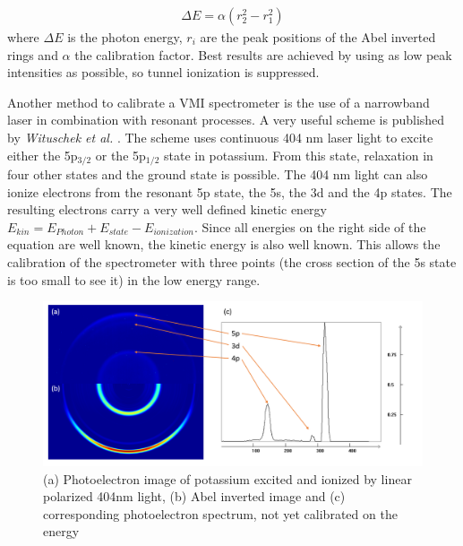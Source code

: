 \begin{align*}
\Delta E = \alpha (r_2^2-r_1^2)
\end{align*}
where $\Delta E$ is the photon energy, $r_i$ are the peak positions of the Abel inverted rings and $\alpha$ the calibration factor. Best results are achieved by using as low peak intensities as possible, so tunnel ionization is suppressed.


Another method to calibrate a VMI spectrometer is the use of a narrowband laser in combination with resonant processes. A very useful scheme is published by \textit{Wituschek et al.} \cite{wituschek_simple_2016}. The scheme uses continuous 404 nm laser light to excite either the 5p${}_{3/2}$ or the 5p${}_{1/2}$ state in potassium. From this state, relaxation in four other states and the ground state is possible. The 404 nm light can also ionize electrons from the resonant 5p state, the 5s, the 3d and the 4p states. The resulting electrons carry a very well defined kinetic energy $E_{kin}=E_{Photon}+E_{state}-E_{ionization}$. Since all energies on the right side of the equation are well known, the kinetic energy is also well known. This allows the calibration of the spectrometer with three points (the cross section of the 5s state is too small to see it) in the low energy range.

\begin{figure}
\centering
\includegraphics[scale=0.5]{../images/potassium_calib.png}
\caption{(a) Photoelectron image of potassium excited and ionized by linear polarized 404nm light, (b) Abel inverted image and (c) corresponding photoelectron spectrum, not yet calibrated on the energy}
\end{figure}


